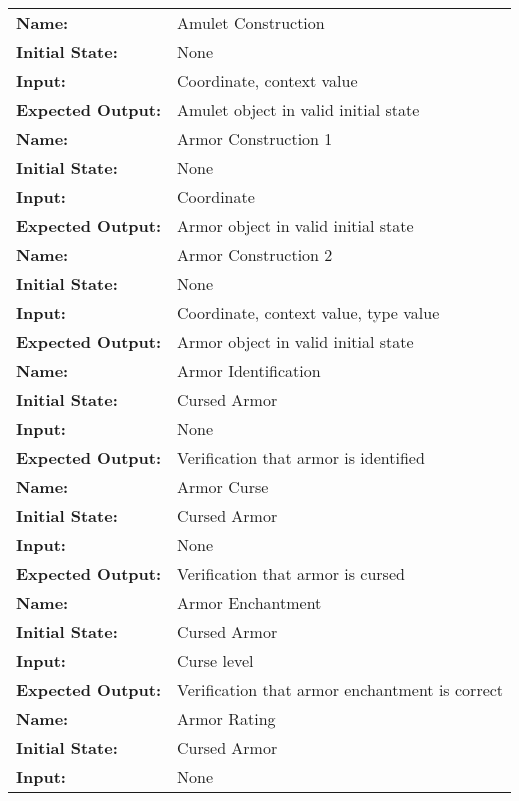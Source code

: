 \documentclass[12pt, titlepage]{article}
\begin{document}
		\begin{center}

			\begin{longtable}{ l | p{10cm} }
				\hline
				\textbf{Name:} & Amulet Construction\\
				\textbf{Initial State:} & None\\
				\textbf{Input:} & Coordinate, context value\\
				\textbf{Expected Output:} & Amulet object in valid initial state\\
				\hline
				\textbf{Name:} & Armor Construction 1\\
				\textbf{Initial State:} & None\\
				\textbf{Input:} & Coordinate\\
				\textbf{Expected Output:} & Armor object in valid initial state\\
				\hline
				\textbf{Name:} & Armor Construction 2\\
				\textbf{Initial State:} & None\\
				\textbf{Input:} & Coordinate, context value, type value\\
				\textbf{Expected Output:} & Armor object in valid initial state\\
				\hline
				\textbf{Name:} & Armor Identification\\
				\textbf{Initial State:} & Cursed Armor\\
				\textbf{Input:} & None\\
				\textbf{Expected Output:} & Verification that armor is identified\\
				\hline
				\textbf{Name:} & Armor Curse\\
				\textbf{Initial State:} & Cursed Armor\\
				\textbf{Input:} & None\\
				\textbf{Expected Output:} & Verification that armor is cursed\\
				\hline
				\textbf{Name:} & Armor Enchantment\\
				\textbf{Initial State:} & Cursed Armor\\
				\textbf{Input:} & Curse level\\
				\textbf{Expected Output:} & Verification that armor enchantment is correct\\
				\hline
				\textbf{Name:} & Armor Rating\\
				\textbf{Initial State:} & Cursed Armor\\
				\textbf{Input:} & None\\

\end{longtable}
\end{center}
\end{document}
